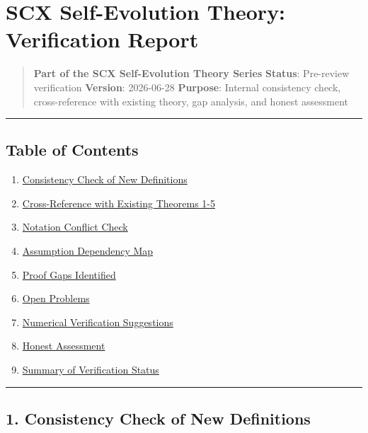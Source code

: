 \documentclass[
  12pt,
]{article}
\author{SCX}
\date{2026}
\providecommand{\tightlist}{%
  \setlength{\itemsep}{0pt}\setlength{\parskip}{0pt}}
\begin{document}
\section{SCX Self-Evolution Theory: Verification
Report}\label{scx-self-evolution-theory-verification-report}

\begin{quote}
\textbf{Part of the SCX Self-Evolution Theory Series} \textbf{Status}:
Pre-review verification \textbf{Version}: 2026-06-28 \textbf{Purpose}:
Internal consistency check, cross-reference with existing theory, gap
analysis, and honest assessment
\end{quote}

\begin{center}\rule{0.5\linewidth}{0.5pt}\end{center}

\subsection{Table of Contents}\label{table-of-contents}

\begin{enumerate}
\def\labelenumi{\arabic{enumi}.}
\tightlist
\item
  \hyperref[1-consistency-check-of-new-definitions]{Consistency Check of
  New Definitions}
\item
  \hyperref[2-cross-reference-with-existing-theorems-1-5]{Cross-Reference
  with Existing Theorems 1-5}
\item
  \hyperref[3-notation-conflict-check]{Notation Conflict Check}
\item
  \hyperref[4-assumption-dependency-map]{Assumption Dependency Map}
\item
  \hyperref[5-proof-gaps-identified]{Proof Gaps Identified}
\item
  \hyperref[6-open-problems]{Open Problems}
\item
  \hyperref[7-numerical-verification-suggestions]{Numerical Verification
  Suggestions}
\item
  \hyperref[8-honest-assessment]{Honest Assessment}
\item
  \hyperref[9-summary-of-verification-status]{Summary of Verification
  Status}
\end{enumerate}

\begin{center}\rule{0.5\linewidth}{0.5pt}\end{center}

\subsection{1. Consistency Check of New
Definitions}\label{consistency-check-of-new-definitions}
\end{document}
